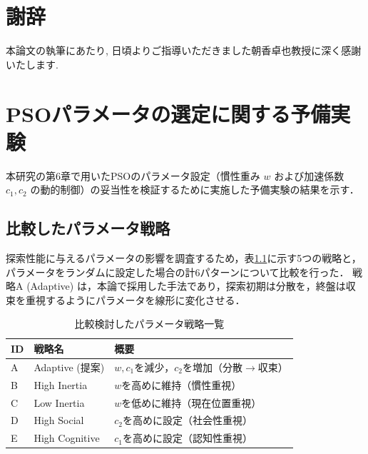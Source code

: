 \documentclass[bachelor]{soturon}
\begin{document}
\chapter*{謝辞}
本論文の執筆にあたり, 日頃よりご指導いただきました朝香卓也教授に深く感謝いたします.

\backmatter                         %




\appendix

\chapter{PSOパラメータの選定に関する予備実験}
\label{app:parameter_tuning}

本研究の第6章で用いたPSOのパラメータ設定（慣性重み $w$ および加速係数 $c_1, c_2$ の動的制御）の妥当性を検証するために実施した予備実験の結果を示す．

\section{比較したパラメータ戦略}
探索性能に与えるパラメータの影響を調査するため，表\ref{tab:param_strategies}に示す5つの戦略と，パラメータをランダムに設定した場合の計6パターンについて比較を行った．
戦略A (Adaptive) は，本論で採用した手法であり，探索初期は分散を，終盤は収束を重視するようにパラメータを線形に変化させる．

\begin{table}[b]
  \centering
  \caption{比較検討したパラメータ戦略一覧}
  \label{tab:param_strategies}
  \begin{tabular}{l|l|l} \hline
    ID & 戦略名 & 概要 \\ \hline
    A & Adaptive (提案) & $w, c_1$を減少，$c_2$を増加（分散$\to$収束） \\
    B & High Inertia & $w$を高めに維持（慣性重視） \\
    C & Low Inertia & $w$を低めに維持（現在位置重視） \\
    D & High Social & $c_2$を高めに設定（社会性重視） \\
    E & High Cognitive & $c_1$を高めに設定（認知性重視） \\ \hline
  \end{tabular}
\end{table}
\end{document}
